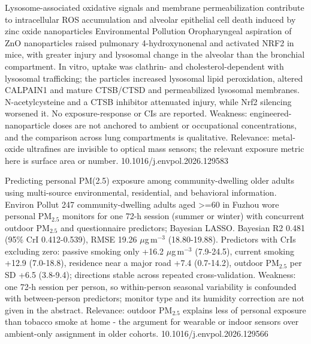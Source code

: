 \documentclass[10pt]{article}
\begin{document}
{Lysosome-associated oxidative signals and membrane permeabilization contribute to intracellular ROS accumulation and alveolar epithelial cell death induced by zinc oxide nanoparticles}
{Environmental Pollution}
{Oropharyngeal aspiration of ZnO nanoparticles raised pulmonary 4-hydroxynonenal and activated NRF2 in mice, with greater injury and lysosomal change in the alveolar than the bronchial compartment. In vitro, uptake was clathrin- and cholesterol-dependent with lysosomal trafficking; the particles increased lysosomal lipid peroxidation, altered CALPAIN1 and mature CTSB/CTSD and permeabilized lysosomal membranes. N-acetylcysteine and a CTSB inhibitor attenuated injury, while Nrf2 silencing worsened it. No exposure-response or CIs are reported. Weakness: engineered-nanoparticle doses are not anchored to ambient or occupational concentrations, and the comparison across lung compartments is qualitative. Relevance: metal-oxide ultrafines are invisible to optical mass sensors; the relevant exposure metric here is surface area or number.}
{10.1016/j.envpol.2026.129583}

\par{}\baselineskip{}\baselineskip
{}

{Predicting personal PM(2.5) exposure among community-dwelling older adults using multi-source environmental, residential, and behavioral information.}
{Environ Pollut}
{247 community-dwelling adults aged >=60 in Fuzhou wore personal PM$_{2.5}$ monitors for one 72-h session (summer or winter) with concurrent outdoor PM$_{2.5}$ and questionnaire predictors; Bayesian LASSO. Bayesian R2 0.481 (95\% CrI 0.412-0.539), RMSE 19.26 $\mu$g\,m$^{-3}$ (18.80-19.88). Predictors with CrIs excluding zero: passive smoking only +16.2 $\mu$g\,m$^{-3}$ (7.9-24.5), current smoking +12.9 (7.0-18.8), residence near a major road +7.4 (0.7-14.2), outdoor PM$_{2.5}$ per SD +6.5 (3.8-9.4); directions stable across repeated cross-validation. Weakness: one 72-h session per person, so within-person seasonal variability is confounded with between-person predictors; monitor type and its humidity correction are not given in the abstract. Relevance: outdoor PM$_{2.5}$ explains less of personal exposure than tobacco smoke at home - the argument for wearable or indoor sensors over ambient-only assignment in older cohorts.}
{10.1016/j.envpol.2026.129566}
\end{document}
